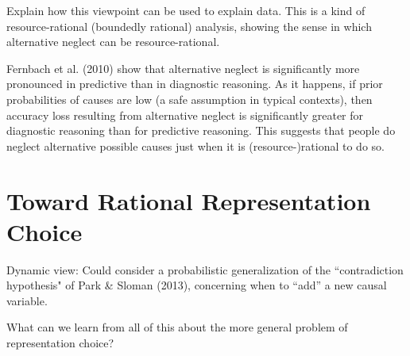 \documentclass[10pt,letterpaper]{article}
\begin{document}
Explain how this viewpoint can be used to explain data. This is a kind of resource-rational (boundedly rational) analysis, showing the sense in which alternative neglect can be resource-rational.

Fernbach et al. (2010) show that alternative neglect is significantly more pronounced in predictive than in diagnostic reasoning. As it happens, if prior probabilities of causes are low (a safe assumption in typical contexts), then accuracy loss resulting from alternative neglect is significantly greater for diagnostic reasoning than for predictive reasoning. This suggests that people do neglect alternative possible causes just when it is (resource-)rational to do so.

\section{Toward Rational Representation Choice}

Dynamic view: Could consider a probabilistic generalization of the ``contradiction hypothesis" of Park \& Sloman (2013), concerning when to ``add'' a new causal variable. 

What can we learn from all of this about the more general problem of representation choice?




\end{document}
